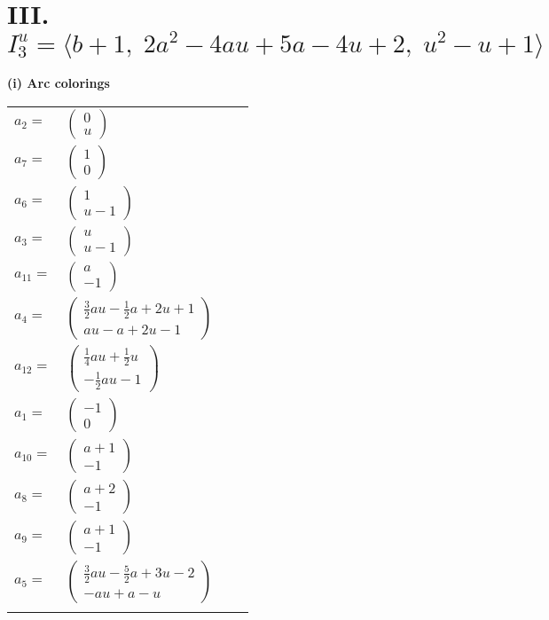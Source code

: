\documentclass[1p]{elsarticle_modified}
\theoremstyle{definition}
\begin{document}
\centering \section*{III. $I^u_{3}= \langle b+1,\;2 a^2-4 a u+5 a-4 u+2,\;u^2- u+1 \rangle$}
\flushleft \textbf{(i) Arc colorings}\\
\begin{tabular}{m{7pt} m{180pt} m{7pt} m{180pt} }
\flushright $a_{2}=$&$\begin{pmatrix}0\\u\end{pmatrix}$ \\
\flushright $a_{7}=$&$\begin{pmatrix}1\\0\end{pmatrix}$ \\
\flushright $a_{6}=$&$\begin{pmatrix}1\\u-1\end{pmatrix}$ \\
\flushright $a_{3}=$&$\begin{pmatrix}u\\u-1\end{pmatrix}$ \\
\flushright $a_{11}=$&$\begin{pmatrix}a\\-1\end{pmatrix}$ \\
\flushright $a_{4}=$&$\begin{pmatrix}\frac{3}{2} a u-\frac{1}{2} a+2 u+1\\a u- a+2 u-1\end{pmatrix}$ \\
\flushright $a_{12}=$&$\begin{pmatrix}\frac{1}{4} a u+\frac{1}{2} u\\-\frac{1}{2} a u-1\end{pmatrix}$ \\
\flushright $a_{1}=$&$\begin{pmatrix}-1\\0\end{pmatrix}$ \\
\flushright $a_{10}=$&$\begin{pmatrix}a+1\\-1\end{pmatrix}$ \\
\flushright $a_{8}=$&$\begin{pmatrix}a+2\\-1\end{pmatrix}$ \\
\flushright $a_{9}=$&$\begin{pmatrix}a+1\\-1\end{pmatrix}$ \\
\flushright $a_{5}=$&$\begin{pmatrix}\frac{3}{2} a u-\frac{5}{2} a+3 u-2\\- a u+a- u\end{pmatrix}$\\&\end{tabular}
\end{document}
